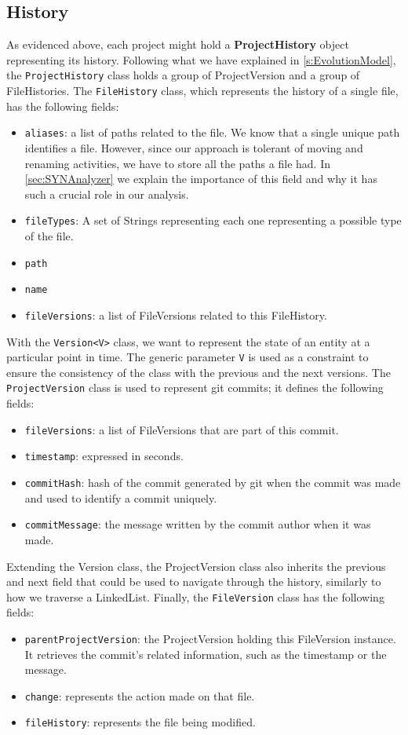 \subsection*{History}

As evidenced above, each project might hold a \textbf{ProjectHistory} object representing its history. 
Following what we have explained in \autoref{s:EvolutionModel}, the \texttt{ProjectHistory} class holds a group of ProjectVersion and a group of FileHistories. The \texttt{FileHistory} class, which represents the history of a single file, has the following fields:
\begin{itemize}
    \item \texttt{aliases}: a list of paths related to the file. We know that a single unique path identifies a file. However, since our approach is tolerant of moving and renaming activities, we have to store all the paths a file had. In \autoref{sec:SYNAnalyzer} we explain the importance of this field and why it has such a crucial role in our analysis. 
    \item \texttt{fileTypes}: A set of Strings representing each one representing a possible type of the file. 
    \item \texttt{path}
    \item \texttt{name}
    \item \texttt{fileVersions}: a list of FileVersions related to this FileHistory. 
\end{itemize}
With the \texttt{Version<V>} class, we want to represent the state of an entity at a particular point in time. 
The generic parameter \texttt{V} is used as a constraint to ensure the consistency of the class with the previous and the next versions. 
The \texttt{ProjectVersion} class is used to represent git commits; it defines the following fields: 
\begin{itemize}
    \item \texttt{fileVersions}: a list of FileVersions that are part of this commit.
    \item \texttt{timestamp}: expressed in seconds. 
    \item \texttt{commitHash}: hash of the commit generated by git when the commit was made and used to identify a commit uniquely. 
    \item \texttt{commitMessage}: the message written by the commit author when it was made. 
\end{itemize}
Extending the Version class, the ProjectVersion class also inherits the previous and next field that could be used to navigate through the history, similarly to how we traverse a LinkedList. 
Finally, the \texttt{FileVersion} class has the following fields:
\begin{itemize}
    \item \texttt{parentProjectVersion}: the ProjectVersion holding this FileVersion instance. It retrieves the commit's related information, such as the timestamp or the message. 
    \item \texttt{change}: represents the action made on that file. 
    \item \texttt{fileHistory}: represents the file being modified. 
\end{itemize}

